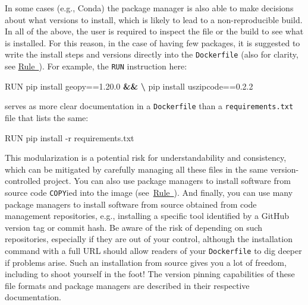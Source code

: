 \documentclass[10pt,letterpaper]{article}
\newenvironment{Shaded}{\begin{snugshade}}{\end{snugshade}}
\newcommand{\ExtensionTok}[1]{#1}
\newcommand{\KeywordTok}[1]{\textcolor[rgb]{0.13,0.29,0.53}{\textbf{#1}}}
\newcommand{\NormalTok}[1]{#1}
\begin{document}
In some cases (e.g., Conda) the package manager is also able to make
decisions about what versions to install, which is likely to lead to a
non-reproducible build. In all of the above, the user is required to
inspect the file or the build to see what is installed. For this reason,
in the case of having few packages, it is suggested to write the install
steps and versions directly into the \texttt{Dockerfile} (also for
clarity, see \hyperref[{rule:clarity}]{Rule~}).
For example, the \texttt{RUN} instruction here:

\footnotesize

\begin{Shaded}
\begin{Highlighting}[]
\ExtensionTok{RUN}\NormalTok{ pip install geopy==1.20.0 }\KeywordTok{&&} \KeywordTok{\textbackslash{}}
    \ExtensionTok{pip}\NormalTok{ install uszipcode==0.2.2}
\end{Highlighting}
\end{Shaded}

\normalsize

serves as more clear documentation in a \texttt{Dockerfile} than a
\texttt{requirements.txt} file that lists the same:

\footnotesize

\begin{Shaded}
\begin{Highlighting}[]
\ExtensionTok{RUN}\NormalTok{ pip install -r requirements.txt}
\end{Highlighting}
\end{Shaded}

\normalsize

This modularization is a potential risk for understandability and
consistency, which can be mitigated by carefully managing all these
files in the same version-controlled project. You can also use package
managers to install software from source code \texttt{COPY}ied into the
image (see~\hyperref[{rule:mount}]{Rule~}). And
finally, you can use many package managers to install software from
source obtained from code management repositories, e.g., installing a
specific tool identified by a GitHub version tag or commit hash. Be
aware of the risk of depending on such repositories, especially if they
are out of your control, although the installation command with a full
URL should allow readers of your \texttt{Dockerfile} to dig deeper if
problems arise. Such an installation from source gives you a lot of
freedom, including to shoot yourself in the foot! The version pinning
capabilities of these file formats and package managers are described in
their respective documentation.
\end{document}
